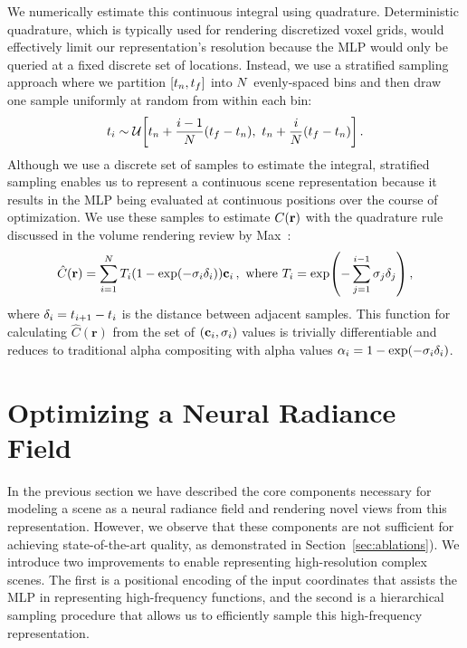 \documentclass[runningheads]{llncs}
\begin{document}
We numerically estimate this continuous integral using quadrature. Deterministic quadrature, which is typically used for rendering discretized voxel grids, would effectively limit our representation's resolution because the MLP would only be queried at a fixed discrete set of locations. Instead, we use a stratified sampling approach where we partition $[t_n, t_f]$ into $N$ evenly-spaced bins and then draw one sample uniformly at random from within each bin:
\begin{equation}
    t_i \sim \mathcal{U} \left[ \timenear + \frac{i-1}{\numsamples}(\timefar-\timenear),\,\, \timenear + \frac{i}{\numsamples}(\timefar-\timenear) \right]\,.
    \label{eq:stratified}
\end{equation} 
Although we use a discrete set of samples to estimate the integral, stratified sampling enables us to represent a continuous scene representation because it results in the MLP being evaluated at continuous positions over the course of optimization. We use these samples to estimate $C(\mathbf{r})$ with the quadrature rule discussed in the volume rendering review by Max~\cite{max95}:
\begin{equation}
\label{eqn:render_coarse}
\hat{C}(\mathbf{r})=\sum_{i=1}^{\numsamples}T_i (1-\expo{-\absrp_i \deltatime_i}) \mathbf{c}_i\,, \textrm{ where }
T_i=\expo{- \sum_{j=1}^{i-1} \absrp_j \deltatime_j}\,,
\end{equation}
where $\delta_i = t_{i+1} - t_i $ is the distance between adjacent samples. 
This function for calculating $\hat{C}(\mathbf{r})$ from the set of $(\mathbf{c}_i, \sigma_i)$ values is trivially differentiable and reduces to traditional alpha compositing with alpha values $\alpha_i = 1-\expo{-\absrp_i \deltatime_i}$. 



\section{Optimizing a Neural Radiance Field}

In the previous section we have described the core components necessary for modeling a scene as a neural radiance field and rendering novel views from this representation. However, we observe that these components are not sufficient for achieving state-of-the-art quality, as demonstrated in Section~\ref{sec:ablations}). We introduce two improvements to enable representing high-resolution complex scenes. The first is a positional encoding of the input coordinates that assists the MLP in representing high-frequency functions, and the second is a hierarchical sampling procedure that allows us to efficiently sample this high-frequency representation. 
\end{document}
